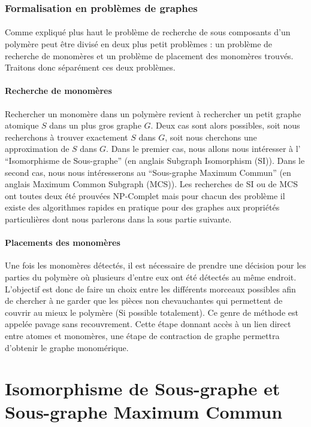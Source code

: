 \documentclass[12pt,french,twoside]{report}
\begin{document}
\subsubsection{Formalisation en problèmes de graphes}

\paragraph{}Comme expliqué plus haut le problème de recherche de sous composants d'un polymère peut être divisé en deux
plus petit problèmes : un problème de recherche de monomères et un problème de placement des monomères trouvés. Traitons
donc séparément ces deux problèmes.

\paragraph{Recherche de monomères}Rechercher un monomère dans un polymère revient à rechercher un petit graphe atomique
$S$ dans un plus gros graphe $G$. Deux cas sont alors possibles, soit nous recherchons à trouver exactement $S$ dans
$G$, soit nous cherchons une approximation de $S$ dans $G$. Dans le premier cas, nous allons nous intéresser à l'
``Isomorphisme de Sous-graphe'' (en anglais Subgraph Isomorphism (SI)). Dans le second cas, nous nous intéresserons au
``Sous-graphe Maximum Commun'' (en anglais Maximum Common Subgraph (MCS)). Les recherches de SI ou de MCS ont toutes
deux été prouvées NP-Complet mais pour chacun des problème il existe des algorithmes rapides en pratique pour des graphes
aux propriétés particulières dont nous parlerons dans la sous partie suivante.

\paragraph{Placements des monomères}Une fois les monomères détectés, il est nécessaire de prendre une décision pour les parties du polymère où plusieurs d'entre eux ont été détectés au même endroit.
L'objectif est donc de faire un choix entre les différents morceaux possibles afin de chercher à ne garder que les pièces non chevauchantes qui permettent de couvrir au mieux le polymère (Si possible totalement).
Ce genre de méthode est appelée pavage sans recouvrement.
Cette étape donnant accès à un lien direct entre atomes et monomères, une étape de contraction de graphe permettra d'obtenir le graphe monomérique.




\section{Isomorphisme de Sous-graphe et Sous-graphe Maximum Commun}
\end{document}
